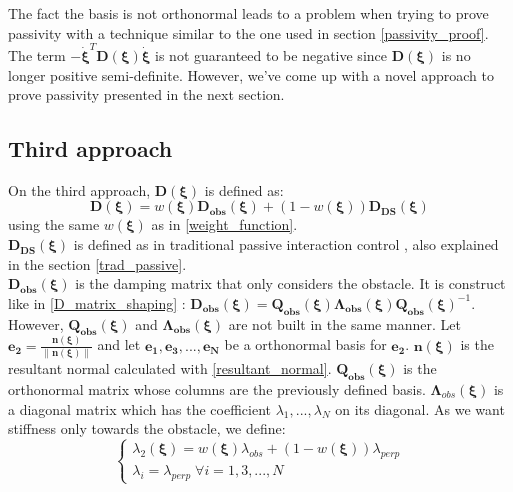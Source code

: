 The fact the basis is not orthonormal leads to a problem when trying to prove passivity with a technique similar to the one used in section \ref{passivity_proof}. The term $-\boldsymbol{\dot\xi}^T \boldsymbol D(\boldsymbol\xi)\boldsymbol{\dot\xi}$ is not guaranteed to be negative since $\boldsymbol D(\boldsymbol\xi)$ is no longer positive semi-definite. However, we've come up with a novel approach to prove passivity presented in the next section. 


\subsection{Third approach}
On the third approach, $\boldsymbol D(\boldsymbol\xi)$ is defined as:
\begin{equation}
   \boldsymbol D(\boldsymbol\xi) = w (\boldsymbol\xi) \boldsymbol{D_{obs}}(\boldsymbol\xi) + (1-w(\boldsymbol\xi)) \boldsymbol{D_{DS}}(\boldsymbol\xi)
\end{equation}
using the same $w(\boldsymbol\xi)$ as in \eqref{weight_function}. \\

$\boldsymbol{D_{DS}}(\boldsymbol\xi)$ is defined as in traditional passive interaction control \cite{kronander2015passive}, also explained in the section \ref{trad_passive}. \\

$\boldsymbol{D_{obs}} (\boldsymbol\xi)$ is the damping matrix that only considers the obstacle. It is construct like in \eqref{D_matrix_shaping} : $\boldsymbol{D_{obs}}(\boldsymbol\xi) = \boldsymbol{Q_{obs}}(\boldsymbol\xi) \boldsymbol{\Lambda_{obs}}(\boldsymbol\xi) \boldsymbol{Q_{obs}}(\boldsymbol\xi)^{-1}$. However, $\boldsymbol{Q_{obs}}(\boldsymbol\xi)$ and $\boldsymbol{\Lambda_{obs}}(\boldsymbol\xi)$ are not built in the same manner. Let $\boldsymbol{e_2} = \frac{\boldsymbol n(\boldsymbol\xi)}{\lVert \boldsymbol n(\boldsymbol\xi) \rVert}$ and let $\boldsymbol{e_1}, \boldsymbol{e_3}, ..., \boldsymbol{e_N}$ be a orthonormal basis for $\boldsymbol{e_2}$. $\boldsymbol n(\boldsymbol\xi)$ is the resultant normal calculated with \eqref{resultant_normal}. $\boldsymbol{Q_{obs}}(\boldsymbol\xi)$ is the orthonormal matrix whose columns are the previously defined basis. $\boldsymbol\Lambda_{obs}(\boldsymbol\xi)$ is a diagonal matrix which has the coefficient $\lambda_1, ..., \lambda_N$ on its diagonal. As we want stiffness only towards the obstacle, we define:
\begin{equation}
\begin{cases}
    \lambda_2(\boldsymbol\xi) = w(\boldsymbol\xi)\lambda_{obs} + (1-w(\boldsymbol\xi))\lambda_{perp}\\
    \lambda_i = \lambda_{perp} \; \forall i = 1, 3, ..., N
\end{cases}
\end{equation}

